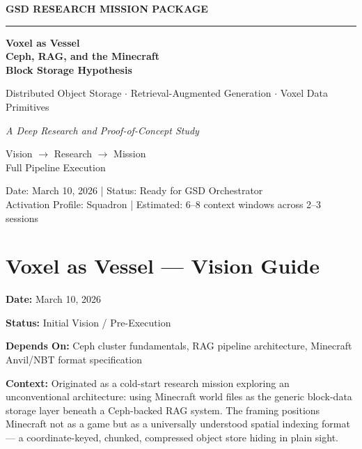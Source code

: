\documentclass[11pt,letterpaper]{article}
\newcommand{\stageheader}[2]{%
  \noindent\colorbox{#2}{\makebox[\textwidth][l]{%
    \textcolor{white}{\bfseries\sffamily\hspace{6pt}#1\hspace{6pt}}}}%
  \vspace{0.5em}\par%
}
\newcommand{\metafield}[2]{\textbf{\sffamily #1} #2\par}
\begin{document}
\thispagestyle{empty}
\begin{center}
\vspace*{3cm}

{\small\sffamily\textcolor{primary}{\textbf{GSD RESEARCH MISSION PACKAGE}}}

\vspace{0.3cm}
\textcolor{bordergray}{\rule{8cm}{0.4pt}}

\vspace{1.5cm}
{\fontsize{26}{32}\selectfont\bfseries\sffamily\textcolor{primary}{Voxel as Vessel\\[0.3em]Ceph, RAG, and the Minecraft\\[0.3em]Block Storage Hypothesis}}

\vspace{0.8cm}
{\Large\sffamily\textcolor{secondary}{Distributed Object Storage $\cdot$ Retrieval-Augmented Generation $\cdot$ Voxel Data Primitives}}

\vspace{0.5cm}
{\large\sffamily\itshape\textcolor{tertiary}{A Deep Research and Proof-of-Concept Study}}

\vspace{3cm}
{\sffamily\textcolor{accent}{Vision $\rightarrow$ Research $\rightarrow$ Mission}}\\[0.3em]
{\small\sffamily\textcolor{accent}{Full Pipeline Execution}}

\vspace{3cm}
{\small\sffamily\textcolor{subtlegray}{Date: March 10, 2026  |  Status: Ready for GSD Orchestrator}}\\[0.3em]
{\small\sffamily\textcolor{subtlegray}{Activation Profile: Squadron  |  Estimated: 6--8 context windows across 2--3 sessions}}
\end{center}
\newpage

\tableofcontents
\newpage

\stageheader{STAGE 1 --- VISION DOCUMENT}{primary}

\section{Voxel as Vessel --- Vision Guide}

\metafield{Date:}{March 10, 2026}
\metafield{Status:}{Initial Vision / Pre-Execution}
\metafield{Depends On:}{Ceph cluster fundamentals, RAG pipeline architecture, Minecraft Anvil/NBT format specification}
\metafield{Context:}{Originated as a cold-start research mission exploring an unconventional architecture: using Minecraft world files as the generic block-data storage layer beneath a Ceph-backed RAG system. The framing positions Minecraft not as a game but as a universally understood spatial indexing format --- a coordinate-keyed, chunked, compressed object store hiding in plain sight.}
\end{document}
